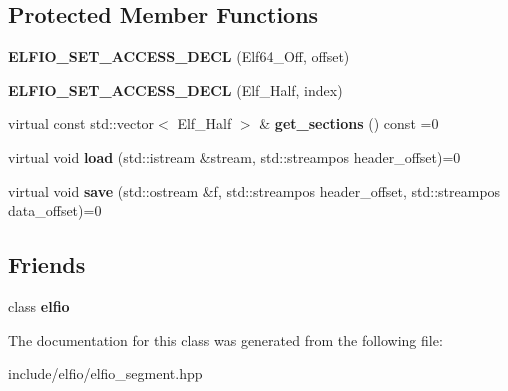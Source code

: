 \subsection*{Protected Member Functions}
\begin{DoxyCompactItemize}
\item 
{\bfseries E\+L\+F\+I\+O\+\_\+\+S\+E\+T\+\_\+\+A\+C\+C\+E\+S\+S\+\_\+\+D\+E\+CL} (Elf64\+\_\+\+Off, offset)\hypertarget{class_e_l_f_i_o_1_1segment_aa4654ca33fb73029ff882ab09b4e9909}{}\label{class_e_l_f_i_o_1_1segment_aa4654ca33fb73029ff882ab09b4e9909}

\item 
{\bfseries E\+L\+F\+I\+O\+\_\+\+S\+E\+T\+\_\+\+A\+C\+C\+E\+S\+S\+\_\+\+D\+E\+CL} (Elf\+\_\+\+Half, index)\hypertarget{class_e_l_f_i_o_1_1segment_a450ecd67a199ce69b2364f89d1bbc1fb}{}\label{class_e_l_f_i_o_1_1segment_a450ecd67a199ce69b2364f89d1bbc1fb}

\item 
virtual const std\+::vector$<$ Elf\+\_\+\+Half $>$ \& {\bfseries get\+\_\+sections} () const =0\hypertarget{class_e_l_f_i_o_1_1segment_ab488583facc3d0f4f79911457c6e073f}{}\label{class_e_l_f_i_o_1_1segment_ab488583facc3d0f4f79911457c6e073f}

\item 
virtual void {\bfseries load} (std\+::istream \&stream, std\+::streampos header\+\_\+offset)=0\hypertarget{class_e_l_f_i_o_1_1segment_a2f538b21d28871c278c0bcdb3991d07d}{}\label{class_e_l_f_i_o_1_1segment_a2f538b21d28871c278c0bcdb3991d07d}

\item 
virtual void {\bfseries save} (std\+::ostream \&f, std\+::streampos header\+\_\+offset, std\+::streampos data\+\_\+offset)=0\hypertarget{class_e_l_f_i_o_1_1segment_a411eb1987c97609b98878c95b44c3f78}{}\label{class_e_l_f_i_o_1_1segment_a411eb1987c97609b98878c95b44c3f78}

\end{DoxyCompactItemize}
\subsection*{Friends}
\begin{DoxyCompactItemize}
\item 
class {\bfseries elfio}\hypertarget{class_e_l_f_i_o_1_1segment_a6c96e3a7c68ba681cd79b5e267538d3d}{}\label{class_e_l_f_i_o_1_1segment_a6c96e3a7c68ba681cd79b5e267538d3d}

\end{DoxyCompactItemize}


The documentation for this class was generated from the following file\+:\begin{DoxyCompactItemize}
\item 
include/elfio/elfio\+\_\+segment.\+hpp\end{DoxyCompactItemize}

